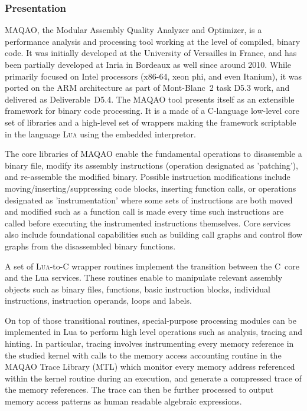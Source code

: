\documentclass[11pt, a4paper, twoside]{montblanc2}
\def\lua{\textsc{Lua}\xspace}
\begin{document}
\subsubsection{Presentation}
MAQAO, the Modular Assembly Quality Analyzer and Optimizer, is a performance analysis and processing 
tool working at the level of compiled, binary code. It was initially developed at the University of 
Versailles in France, and has been partially developed at Inria in Bordeaux as well since around 
2010. While primarily focused on Intel processors (x86-64, xeon phi, and even Itanium), it was 
ported on the ARM architecture as part of Mont-Blanc~2 task D5.3 work, and delivered as 
Deliverable~D5.4. The MAQAO tool presents itself as an extensible framework for binary code 
processing. It is a made of a C-language low-level core set of libraries and a high-level set of 
wrappers making the framework scriptable in the language \lua using the embedded interpretor. 

The core libraries of MAQAO enable the fundamental operations to disassemble a binary file, modify 
its assembly instructions (operation designated as 'patching'), and re-assemble the modified binary. 
Possible instruction modifications include moving/inserting/suppressing code blocks, inserting 
function calls, or operations designated as 'instrumentation' where some sets of instructions are 
both moved and modified such as a function call is made every time such instructions are called 
before executing the instrumented instructions themselves. Core services also include foundational 
capabilities such as building call graphs and control flow graphs from the disassembled binary 
functions.

A set of \lua-to-C wrapper routines implement the transition between the C~core and the Lua 
services. These routines enable to manipulate relevant assembly objects such as binary files, 
functions, basic instruction blocks, individual instructions, instruction operands, loops and 
labels. 

On top of those transitional routines, special-purpose processing modules can be implemented in Lua 
to perform high level operations such as analysis, tracing and hinting. In particular, tracing 
involves instrumenting every memory reference in the studied kernel with calls to the memory access 
accounting routine in the MAQAO Trace Library (MTL) which monitor every memory address referenced 
within the kernel routine during an execution, and generate a compressed trace of the memory 
references. The trace can then be further processed to output memory access patterns as human 
readable algebraic expressions.
\end{document}
